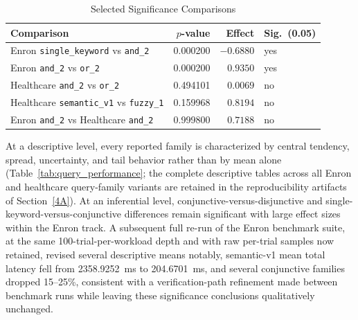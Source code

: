 \begin{table}[t]
\centering
\caption{Selected Significance Comparisons}
\label{tab:sig}
\scriptsize
\setlength{\tabcolsep}{3pt}
\begin{tabular}{p{2.9cm}rrl}
\toprule
\textbf{Comparison} & \textbf{$p$-value} & \textbf{Effect} & \textbf{Sig.\ (0.05)} \\
\midrule
Enron \texttt{single\_keyword} vs \texttt{and\_2} & 0.000200 & $-0.6880$ & yes \\
Enron \texttt{and\_2} vs \texttt{or\_2} & 0.000200 & $0.9350$ & yes \\
Healthcare \texttt{and\_2} vs \texttt{or\_2} & 0.494101 & $0.0069$ & no \\
Healthcare \texttt{semantic\_v1} vs \texttt{fuzzy\_1} & 0.159968 & $0.8194$ & no \\
Enron \texttt{and\_2} vs Healthcare \texttt{and\_2} & 0.999800 & $0.7188$ & no \\
\bottomrule
\end{tabular}
\end{table}
At a descriptive level, every reported family is characterized by central tendency, spread, uncertainty, and tail behavior rather than by mean alone (Table~\ref{tab:query_performance}; the complete descriptive tables across all Enron and healthcare query-family variants are retained in the reproducibility artifacts of Section~\ref{4A}). At an inferential level, conjunctive-versus-disjunctive and single-keyword-versus-conjunctive differences remain significant with large effect sizes within the Enron track. A subsequent full re-run of the Enron benchmark suite, at the same 100-trial-per-workload depth and with raw per-trial samples now retained, revised several descriptive means notably, semantic-v1 mean total latency fell from 2358.9252~ms to 204.6701~ms, and several conjunctive families dropped 15--25\%, consistent with a verification-path refinement made between benchmark runs while leaving these significance conclusions qualitatively unchanged.

